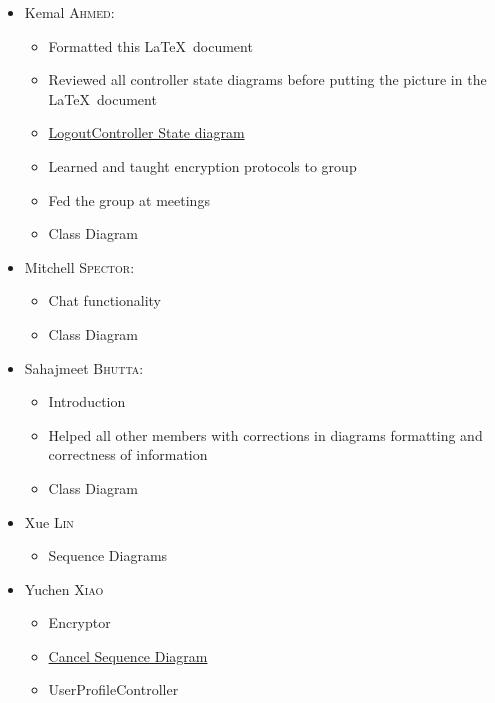 \documentclass[]{article}
\begin{document}
\begin{itemize}
    \item Kemal \textsc{Ahmed}:
        \begin{itemize}
        \item Formatted this \LaTeX \ document
        \item Reviewed all controller state diagrams before putting the picture in the \LaTeX \ document
        \item \hyperref[LCState]{LogoutController State diagram}
        \item Learned and taught encryption protocols to group
        \item Fed the group at meetings
        \item Class Diagram
        \end{itemize}
    \item Mitchell \textsc{Spector}:
        \begin{itemize}
        \item Chat functionality
        \item Class Diagram
        \end{itemize}
    \item Sahajmeet \textsc{Bhutta}:
        \begin{itemize}
        \item Introduction
        \item Helped all other members with corrections in diagrams formatting and correctness of information
        \item Class Diagram
        \end{itemize}
    \item Xue \textsc{Lin}
        \begin{itemize}
        \item Sequence Diagrams
        \end{itemize}
    \item Yuchen \textsc{Xiao}
        \begin{itemize}
        \item Encryptor
        \item \hyperref[SeqDi]{Cancel Sequence Diagram}
        \item UserProfileController
        \end{itemize}
\end{itemize}

\end{document}
